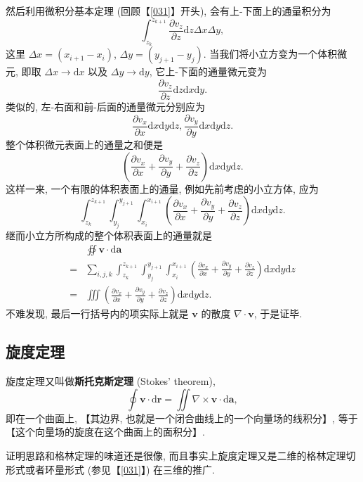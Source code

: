 然后利用微积分基本定理 (回顾【\ref{031}】开头), 会有上-下面上的通量积分为 \[
\int_{z_k}^{z_{k+1}}\frac{\partial v_z}{\partial z}\mathrm{d}z\Delta x\Delta y,
\] 这里 $\Delta x=(x_{i+1}-x_i)$, $\Delta y=(y_{j+1}-y_{j})$.
当我们将小立方变为一个体积微元, 即取 $\Delta x\rightarrow \mathrm{d}x$
以及 $\Delta y\rightarrow\mathrm{d}y$, 它上-下面的通量微元变为 \[
\frac{\partial v_z}{\partial z}\mathrm{d}z\mathrm{d}x\mathrm{d}y.
\] 类似的, 左-右面和前-后面的通量微元分别应为 \[
\frac{\partial v_x}{\partial x}\mathrm{d}x\mathrm{d}y\mathrm{d}z,\frac{\partial v_y}{\partial y}\mathrm{d}x\mathrm{d}y\mathrm{d}z.
\] 整个体积微元表面上的通量之和便是 \[
\left(\frac{\partial v_x}{\partial x}+\frac{\partial v_y}{\partial y}+\frac{\partial v_z}{\partial z}\right)\mathrm{d}x\mathrm{d}y\mathrm{d}z.
\] 这样一来, 一个有限的体积表面上的通量, 例如先前考虑的小立方体, 应为 \[
\int_{z_k}^{z_{k+1}}\int_{y_j}^{y_{j+1}}\int_{x_i}^{x_{i+1}}\left(\frac{\partial v_x}{\partial x}+\frac{\partial v_y}{\partial y}+\frac{\partial v_z}{\partial z}\right)\mathrm{d}x\mathrm{d}y\mathrm{d}z.
\] 继而小立方所构成的整个体积表面上的通量就是 \[
\begin{aligned}
&\oiint\boldsymbol{v}\cdot\mathrm{d}\boldsymbol{a}\\
=&\sum_{i,j,k}\int_{z_k}^{z_{k+1}}\int_{y_j}^{y_{j+1}}\int_{x_i}^{x_{i+1}}\left(\frac{\partial v_x}{\partial x}+\frac{\partial v_y}{\partial y}+\frac{\partial v_z}{\partial z}\right)\mathrm{d}x\mathrm{d}y\mathrm{d}z\\
=&\iiint\left(\frac{\partial v_x}{\partial x}+\frac{\partial v_y}{\partial y}+\frac{\partial v_z}{\partial z}\right)\mathrm{d}x\mathrm{d}y\mathrm{d}z.
\end{aligned}
\] 不难发现, 最后一行括号内的项实际上就是 $\boldsymbol{v}$ 的散度
$\nabla\cdot\boldsymbol{v}$, 于是证毕.

\subsection{旋度定理}

旋度定理又叫做\textbf{斯托克斯定理} (Stokes' theorem), \[
\boxed{\oint\boldsymbol{v}\cdot\mathrm{d}\boldsymbol{r}=\iint\nabla\times\boldsymbol{v}\cdot\mathrm{d}\boldsymbol{a}},
\] 即在一个曲面上, 【其边界, 也就是一个闭合曲线上的一个向量场的线积分】,
等于【这个向量场的旋度在这个曲面上的面积分】.

证明思路和格林定理的味道还是很像,
而且事实上旋度定理又是二维的格林定理切形式或者环量形式 (参见【\ref{031}】)
在三维的推广.

